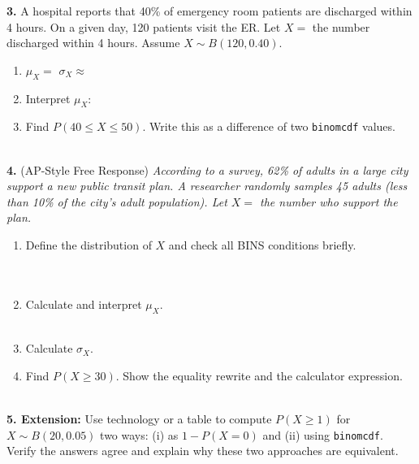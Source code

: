 \documentclass[10pt]{article}
\begin{document}
\begin{practicebox}
\vspace{8pt}
\textbf{3.} A hospital reports that 40\% of emergency room patients are discharged
within 4 hours. On a given day, 120 patients visit the ER.
Let $X =$ the number discharged within 4 hours. Assume $X \sim B(120, 0.40)$.
\begin{enumerate}[label=(\alph*), leftmargin=2em, itemsep=8pt]
  \item $\mu_X = $ \blank{2cm} \qquad $\sigma_X \approx$ \blank{2cm}
  \item Interpret $\mu_X$: \writeline\\[1pt]\writeline
  \item Find $P(40 \le X \le 50)$. Write this as a difference of two \texttt{binomcdf} values.\\
        \writeline\\[1pt]\writeline
\end{enumerate}

\vspace{8pt}
\textbf{4.} (AP-Style Free Response) \textit{According to a survey, 62\% of adults in
a large city support a new public transit plan. A researcher randomly samples
45 adults (less than 10\% of the city's adult population).
Let $X =$ the number who support the plan.}
\begin{enumerate}[label=(\alph*), leftmargin=2em, itemsep=8pt]
  \item Define the distribution of $X$ and check all BINS conditions briefly.\\
        \writeline\\[1pt]\writeline\\[1pt]\writeline
  \item Calculate and interpret $\mu_X$.\\
        \writeline\\[1pt]\writeline
  \item Calculate $\sigma_X$.\\
        \writeline
  \item Find $P(X \ge 30)$. Show the equality rewrite and the calculator expression.\\
        \writeline\\[1pt]\writeline
\end{enumerate}

\vspace{8pt}
\textbf{5. Extension:} Use technology or a table to compute $P(X \ge 1)$ for
$X \sim B(20, 0.05)$ two ways: (i) as $1 - P(X = 0)$ and (ii) using
\texttt{binomcdf}. Verify the answers agree and explain why these two approaches
are equivalent.

\vspace{4pt}
\writeline\\[1pt]\writeline\\[1pt]\writeline

\end{practicebox}
\end{document}
